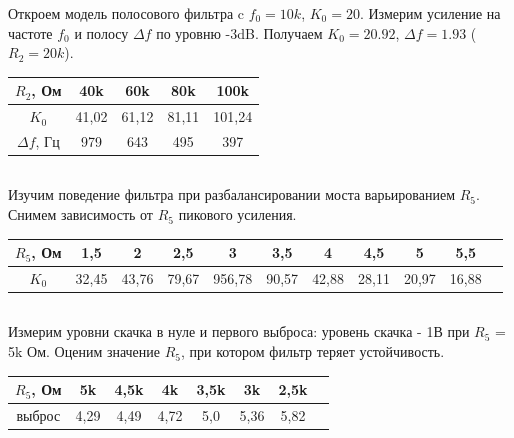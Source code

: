 \documentclass[a4paper, 12pt]{article}%
\begin{document}
 Откроем модель полосового фильтра c $f_0 = 10k$, $K_0 = 20$. Измерим
усиление на частоте $f_0$ и полосу $\Delta f$ по уровню -3dB. Получаем $K_0 = 20.92$,
$\Delta f = 1.93$ ($R_2 = 20k$).


\begin{center}
\begin{tabular}{|c|c|c|c|c|}
\hline 
$R_2$, Ом & 40k & 60k & 80k & 100k \\ 
\hline 
$K_0$ & 41,02 & 61,12 & 81,11 & 101,24 \\ 
\hline 
$\Delta f$, Гц & 979 & 643 & 495 & 397 \\ 
\hline 
\end{tabular} 
\end{center}


\subsection{}

Изучим поведение фильтра при разбалансировании моста варьированием $R_5$. Снимем зависимость от $R_5$ пикового усиления.
\begin{center}
\begin{tabular}{|c|c|c|c|c|c|c|c|c|c|c|}
\hline 
$R_5$, Ом & 1,5 & 2 & 2,5 & 3 & 3,5 & 4 & 4,5 & 5 & 5,5 \\ 
\hline 
$K_0$ & 32,45 & 43,76 & 79,67 & 956,78 & 90,57 & 42,88 & 28,11 & 20,97 & 16,88 \\ 
\hline 
\end{tabular} 
\end{center}

\subsection{}
Измерим уровни скачка в нуле и первого выброса: уровень скачка - 1В при $R_5$ =
5k Ом.
Оценим значение $R_5$, при котором фильтр теряет устойчивость.

\begin{center}
\begin{tabular}{|c|c|c|c|c|c|c|c|}
\hline 
$R_5$, Ом & 5k & 4,5k & 4k & 3,5k & 3k & 2,5k \\ 
\hline 
выброс & 4,29 & 4,49 & 4,72 & 5,0 & 5,36 & 5,82 \\ 
\hline 
\end{tabular} 
\end{center}


\subsection{}
\end{document}
